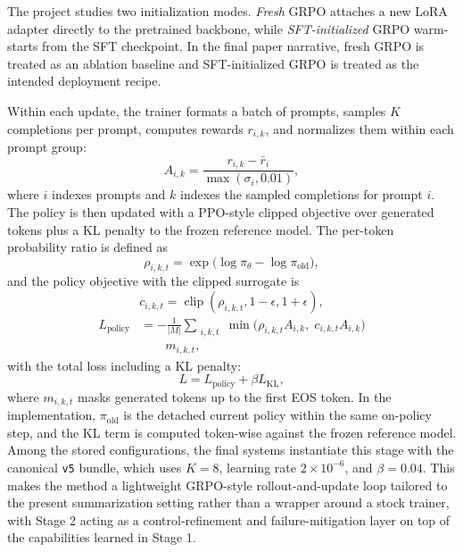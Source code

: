 \documentclass[11pt]{article}
\begin{document}
The project studies two initialization modes. \emph{Fresh} GRPO attaches a
new LoRA adapter directly to the pretrained backbone, while
\emph{SFT-initialized} GRPO warm-starts from the SFT checkpoint. In the final
paper narrative, fresh GRPO is treated as an ablation baseline and
SFT-initialized GRPO is treated as the intended deployment recipe.

Within each update, the trainer formats a batch of prompts, samples $K$
completions per prompt, computes rewards $r_{i,k}$, and normalizes them
within each prompt group:
\begin{equation}
A_{i,k} = \frac{r_{i,k} - \bar{r}_{i}}{\max(\sigma_i, 0.01)},
\end{equation}
where $i$ indexes prompts and $k$ indexes the sampled completions for prompt $i$.
The policy is then updated with a PPO-style clipped objective over generated
tokens plus a KL penalty to the frozen reference model. The per-token
probability ratio is defined as
\begin{equation}
\rho_{i,k,t} = \exp\bigl(\log \pi_{\theta} - \log \pi_{\text{old}}\bigr),
\end{equation}
and the policy objective with the clipped surrogate is
\begin{equation}
c_{i,k,t} = \operatorname{clip}(\rho_{i,k,t}, 1-\epsilon, 1+\epsilon),
\end{equation}
\begin{equation}
\begin{aligned}
L_{\text{policy}}
&= -\frac{1}{|M|} \sum_{\substack{i,k,t}} \min\bigl( \rho_{i,k,t} A_{i,k},\; c_{i,k,t} A_{i,k} \bigr) \\
&\qquad m_{i,k,t},
\end{aligned}
\end{equation}
with the total loss including a KL penalty:
\begin{equation}
L = L_{\text{policy}} + \beta L_{\text{KL}},
\end{equation}
where $m_{i,k,t}$ masks generated tokens up to the first EOS token.
In the implementation, $\pi_{\text{old}}$ is the detached current policy
within the same on-policy step, and the KL term is computed token-wise
against the frozen reference model. Among the stored configurations, the final
systems instantiate this stage with the canonical \texttt{v5} bundle, which
uses $K=8$, learning rate $2\times10^{-6}$, and $\beta=0.04$. This makes the
method a lightweight GRPO-style rollout-and-update loop tailored to the
present summarization setting rather than a wrapper around a stock trainer,
with Stage 2 acting as a control-refinement and failure-mitigation layer on
top of the capabilities learned in Stage 1.
\end{document}
